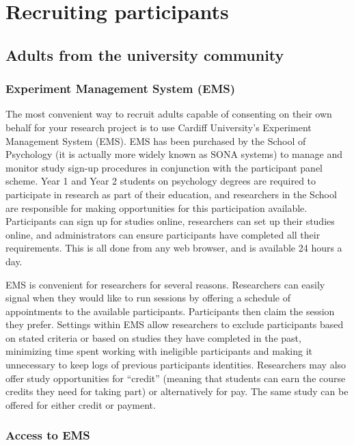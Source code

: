 \documentclass[
  12pt,
]{book}
\begin{document}
\chapter{Recruiting participants}\label{recruiting-participants}

\section{Adults from the university community}\label{adults-from-the-university-community}

\subsection{Experiment Management System (EMS)}\label{experiment-management-system-ems}

The most convenient way to recruit adults capable of consenting on their own behalf for your research project is to use Cardiff University's Experiment Management System (EMS). EMS has been purchased by the School of Psychology (it is actually more widely known as SONA systems) to manage and monitor study sign-up procedures in conjunction with the participant panel scheme. Year 1 and Year 2 students on psychology degrees are required to participate in research as part of their education, and researchers in the School are responsible for making opportunities for this participation available. Participants can sign up for studies online, researchers can set up their studies online, and administrators can ensure participants have completed all their requirements. This is all done from any web browser, and is available 24 hours a day.

EMS is convenient for researchers for several reasons. Researchers can easily signal when they would like to run sessions by offering a schedule of appointments to the available participants. Participants then claim the session they prefer. Settings within EMS allow researchers to exclude participants based on stated criteria or based on studies they have completed in the past, minimizing time spent working with ineligible participants and making it unnecessary to keep logs of previous participants identities. Researchers may also offer study opportunities for ``credit'' (meaning that students can earn the course credits they need for taking part) or alternatively for pay. The same study can be offered for either credit or payment.

\subsection{Access to EMS}\label{access-to-ems}
\end{document}
